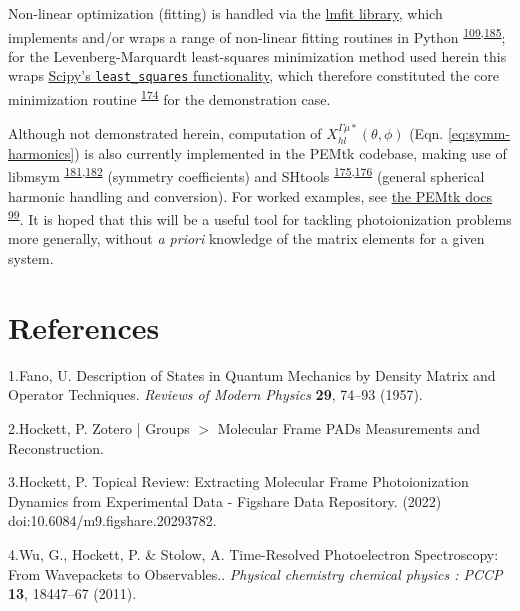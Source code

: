 \documentclass[10pt]{article}
\begin{document}
Non-linear optimization (fitting) is handled via the \href{https://lmfit.github.io/lmfit-py/index.html}{lmfit library}, which implements and/or wraps a range of non-linear fitting routines in Python \textsuperscript{\hyperref[csl:109]{109},\hyperref[csl:185]{185}}; for the Levenberg-Marquardt least-squares minimization method used herein this wraps 
\href{https://docs.scipy.org/doc/scipy/reference/generated/scipy.optimize.least_squares.html}{Scipy's \texttt{least\_squares} functionality}, which therefore constituted the core minimization routine \textsuperscript{\hyperref[csl:174]{174}} for the demonstration case.

Although not demonstrated herein, computation of $X_{hl}^{\Gamma\mu*}(\theta,\phi)$ (Eqn. \ref{eq:symm-harmonics}) is also currently implemented in the PEMtk codebase, making use of libmsym \textsuperscript{\hyperref[csl:181]{181},\hyperref[csl:182]{182}} (symmetry coefficients) and SHtools \textsuperscript{\hyperref[csl:175]{175},\hyperref[csl:176]{176}} (general spherical harmonic handling and conversion). For worked examples, see \href{https://pemtk.readthedocs.io/en/latest/sym/pemtk_symHarm_demo_160322_tidy.html}{the PEMtk docs} \textsuperscript{\hyperref[csl:99]{99}}. It is hoped that this will be a useful tool for tackling photoionization problems more generally, without \textit{a priori} knowledge of the matrix elements for a given system.

\FloatBarrier
\section*{References}\sloppy
{}
\label{csl:1}1.Fano, U. {Description of {{States}} in {{Quantum Mechanics}} by {{Density Matrix}} and {{Operator Techniques}}}. \textit{Reviews of Modern Physics} \textbf{29}, 74–93 (1957).

\label{csl:2}2.Hockett, P. {Zotero | {{Groups}} {$>$} {{Molecular Frame PADs Measurements}} and {{Reconstruction}}}.

\label{csl:3}3.Hockett, P. {Topical {{Review}}: {{Extracting Molecular Frame Photoionization Dynamics}} from {{Experimental Data}} - {{Figshare}} Data Repository}. (2022) doi:10.6084/m9.figshare.20293782.

\label{csl:4}4.Wu, G., Hockett, P. \& Stolow, A. {Time-Resolved Photoelectron Spectroscopy: From Wavepackets to Observables.}. \textit{Physical chemistry chemical physics : PCCP} \textbf{13}, 18447–67 (2011).
\end{document}
